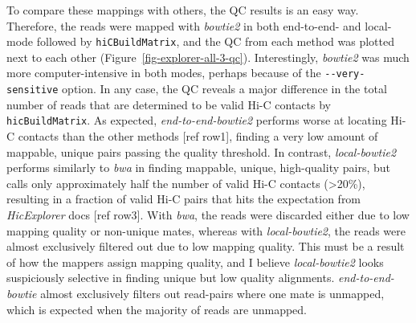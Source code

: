 \documentclass[
  11pt,
  a4paper,
]{scrbook}
\let\oldemph\emph
\renewcommand\emph[1]{\oldemph{\color{gray}#1}}
\begin{document}
To compare these mappings with others, the QC results is an easy way.
Therefore, the reads were mapped with \emph{bowtie2} in both end-to-end-
and local-mode followed by \texttt{hiCBuildMatrix}, and the QC from each
method was plotted next to each other
(Figure~\ref{fig-explorer-all-3-qc}). Interestingly, \emph{bowtie2} was
much more computer-intensive in both modes, perhaps because of the
\texttt{-\/-very-sensitive} option. In any case, the QC reveals a major
difference in the total number of reads that are determined to be valid
Hi-C contacts by \texttt{hicBuildMatrix}. As expected,
\emph{end-to-end-bowtie2} performs worse at locating Hi-C contacts than
the other methods {[}ref row1{]}, finding a very low amount of mappable,
unique pairs passing the quality threshold. In contrast,
\emph{local-bowtie2} performs similarly to \emph{bwa} in finding
mappable, unique, high-quality pairs, but calls only approximately half
the number of valid Hi-C contacts (\textgreater20\%), resulting in a
fraction of valid Hi-C pairs that hits the expectation from
\emph{HicExplorer} docs {[}ref row3{]}. With \emph{bwa}, the reads were
discarded either due to low mapping quality or non-unique mates, whereas
with \emph{local-bowtie2}, the reads were almost exclusively filtered
out due to low mapping quality. This must be a result of how the mappers
assign mapping quality, and I believe \emph{local-bowtie2} looks
suspiciously selective in finding unique but low quality alignments.
\emph{end-to-end-bowtie} almost exclusively filters out read-pairs where
one mate is unmapped, which is expected when the majority of reads are
unmapped.
\end{document}

